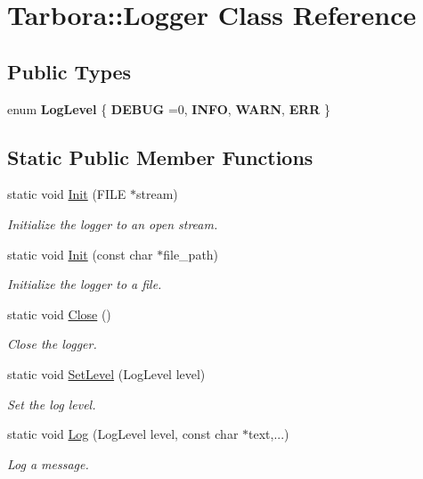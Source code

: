 \hypertarget{classTarbora_1_1Logger}{}\section{Tarbora\+:\+:Logger Class Reference}
\label{classTarbora_1_1Logger}
\subsection*{Public Types}
\begin{DoxyCompactItemize}
\item 
\mbox{\label{classTarbora_1_1Logger_a0596faea258f2da51ad7ca3abd806be3}} 
enum {\bfseries Log\+Level} \{ {\bfseries D\+E\+B\+UG} =0, 
{\bfseries I\+N\+FO}, 
{\bfseries W\+A\+RN}, 
{\bfseries E\+RR}
 \}
\end{DoxyCompactItemize}
\subsection*{Static Public Member Functions}
\begin{DoxyCompactItemize}
\item 
static void \hyperlink{classTarbora_1_1Logger_a55be0d3eeea01a9fbb0a26e029451411}{Init} (F\+I\+LE $\ast$stream)
\begin{DoxyCompactList}\small\item\em Initialize the logger to an open stream. \end{DoxyCompactList}\item 
static void \hyperlink{classTarbora_1_1Logger_af5cc4f3b068f2bde26943da40e1d6e91}{Init} (const char $\ast$file\+\_\+path)
\begin{DoxyCompactList}\small\item\em Initialize the logger to a file. \end{DoxyCompactList}\item 
\mbox{\label{classTarbora_1_1Logger_add4c310a2ab7b0daa730e477853d6c8f}} 
static void \hyperlink{classTarbora_1_1Logger_add4c310a2ab7b0daa730e477853d6c8f}{Close} ()
\begin{DoxyCompactList}\small\item\em Close the logger. \end{DoxyCompactList}\item 
static void \hyperlink{classTarbora_1_1Logger_af2a11244236bad59fce9cc6a1360af29}{Set\+Level} (Log\+Level level)
\begin{DoxyCompactList}\small\item\em Set the log level. \end{DoxyCompactList}\item 
static void \hyperlink{classTarbora_1_1Logger_aa32641fca455178d88f3b1c8b2f552ab}{Log} (Log\+Level level, const char $\ast$text,...)
\begin{DoxyCompactList}\small\item\em Log a message. \end{DoxyCompactList}\end{DoxyCompactItemize}


